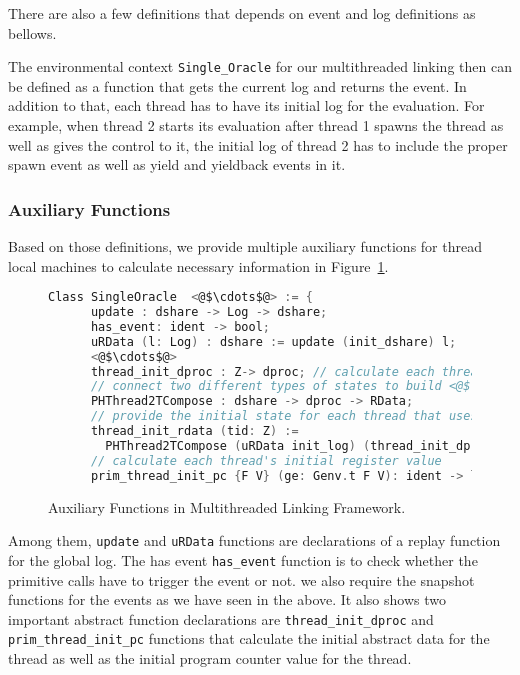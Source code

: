 There are also a few definitions that depends on event and log definitions as bellows.

The environmental context \lstinline$Single_Oracle$  for our multithreaded linking
then can be defined as a function that gets the current log and returns the event. 
In addition to that, 
each thread has to have its initial log for the evaluation. 
For example,
when thread 2 starts its evaluation after thread 1 spawns the thread as well as gives the control to it, 
the initial log of thread 2 has to include the proper spawn event as well as yield and yieldback events in it. 

\subsubsection{Auxiliary Functions}

Based on those definitions, we provide multiple auxiliary functions 
for thread local machines to calculate necessary information in Figure~\ref{fig:chapter:conlink:multithreaded-linking-aux-functions}.

\begin{figure}
\begin{lstlisting}[language=C, morekeywords={Class}]
  Class SingleOracle  <@$\cdots$@> := {
      update : dshare -> Log -> dshare;
      has_event: ident -> bool;      
      uRData (l: Log) : dshare := update (init_dshare) l;
      <@$\cdots$@>
      thread_init_dproc : Z-> dproc; // calculate each thread's initial private state
      // connect two different types of states to build <@$\color{red} \hasmmach$@>
      PHThread2TCompose : dshare -> dproc -> RData; 
      // provide the initial state for each thread that uses  <@$\color{red} \hasmmach$@>
      thread_init_rdata (tid: Z) :=
        PHThread2TCompose (uRData init_log) (thread_init_dproc tid);
      // calculate each thread's initial register value
      prim_thread_init_pc {F V} (ge: Genv.t F V): ident -> list lval -> option val }.
\end{lstlisting}
\caption{Auxiliary Functions in Multithreaded Linking Framework.}
\label{fig:chapter:conlink:multithreaded-linking-aux-functions}
\end{figure}
Among them,  \lstinline$update$ and \lstinline$uRData$ functions are  declarations of a replay function for the global log. 
The has event \lstinline$has_event$ function is to check whether the primitive calls have to trigger the event or not. 
we also require the snapshot functions for the events as we have seen in the above.
It also shows two important abstract function declarations 
are \lstinline$thread_init_dproc$ and \lstinline$prim_thread_init_pc$ functions 
that calculate the initial abstract data for the thread as well as the initial program counter value 
for the thread. 

